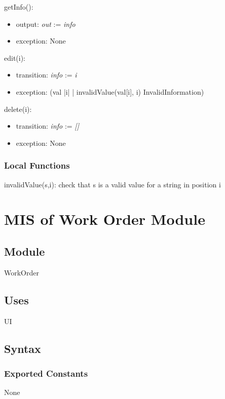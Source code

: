 \documentclass[12pt, titlepage]{article}
\begin{document}
\hfill

\noindent getInfo():
\begin{itemize}
\item output: \textit{out} := \textit{info}
\item exception: None
\end{itemize}

\noindent edit(i):
\begin{itemize}
\item transition: \textit{info} := \textit{i}
\item exception: (\forall val \in |i| | invalidValue(val[i], i) \Rightarrow InvalidInformation)
\end{itemize}

\hfill

\noindent delete(i):
\begin{itemize}
\item transition:  \textit{info} := \textit{[]}
\item exception: None
\end{itemize}

\subsubsection{Local Functions}

invalidValue(s,i): check that s is a valid value for a string in position i

\newpage

\section{MIS of Work Order Module} \label{mWorkOrder}

\subsection{Module}

WorkOrder

\subsection{Uses}
UI

\subsection{Syntax}

\subsubsection{Exported Constants}
None
\end{document}
